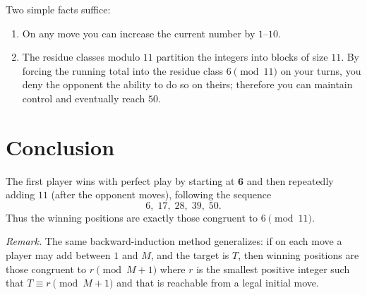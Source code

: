 \documentclass[11pt]{article}
\begin{document}
Two simple facts suffice:
\begin{enumerate}
  \item On any move you can increase the current number by $1$--$10$.
  \item The residue classes modulo $11$ partition the integers into blocks of size $11$. By forcing the running total into the residue class $6\pmod{11}$ on your turns, you deny the opponent the ability to do so on theirs; therefore you can maintain control and eventually reach $50$.
\end{enumerate}

\section*{Conclusion}

\begin{tcolorbox}[conclbox, title=Summary]
The first player wins with perfect play by starting at \(\mathbf{6}\) and then repeatedly adding \(11\) (after the opponent moves), following the sequence
\[
6,\;17,\;28,\;39,\;50.
\]
Thus the winning positions are exactly those congruent to \(6\pmod{11}\).
\end{tcolorbox}

\vspace{6pt}
\noindent\textit{Remark.} The same backward-induction method generalizes: if on each move a player may add between \(1\) and \(M\), and the target is \(T\), then winning positions are those congruent to \(r\pmod{M+1}\) where \(r\) is the smallest positive integer such that \(T\equiv r\pmod{M+1}\) and that is reachable from a legal initial move.
\end{document}
